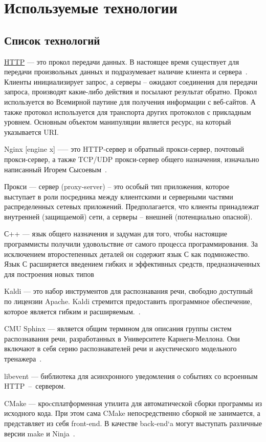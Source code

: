 
\chapter{Используемые технологии}
\section{Список технологий}

\hyperlink{http}{HTTP} --- это прокол передачи данных. В настоящее время существует для передачи
произвольных данных и подразумевает наличие клиента и сервера~\cite{http}.
Клиенты инициализирует запрос, а серверы – ожидают соединения для передачи
запроса, производят какие-либо действия и посылают результат обратно. Прокол
используется во Всемирной паутине для получения информации с веб-сайтов. А
также протокол используется для транспорта других протоколов с прикладным
уровнем. Основным объектом манипуляции является ресурс, на который указывается URI.

Nginx [engine x] —-- это HTTP-сервер и обратный прокси-сервер, почтовый
прокси-сервер, а также TCP/UDP прокси-сервер общего назначения, изначально
написанный Игорем Сысоевым~\cite{nginx}.

Прокси --- сервер (proxy-server) – это особый тип приложения, которое
выступает в роли посредника между клиентскими и серверными частями
распределенных сетевых приложений. Предполагается, что клиенты принадлежат
внутренней (защищаемой) сети, а серверы – внешней (потенциально опасной).

С++ --- язык общего назначения и задуман для того, чтобы настоящие программисты получили
удовольствие от самого процесса программирования. За исключением второстепенных деталей он
содержит язык С как подмножество. Язык С расширяется введением гибких и эффективных средств,
предназначенных для построения новых типов~\cite{cpp}

Kaldi --- это набор инструментов для распознавания речи, свободно доступный по
лицензии Apache. Kaldi стремится предоставить программное обеспечение, которое
является гибким и расширяемым.~\cite{kaldi}.

CMU Sphinx --- является общим термином для описания группы систем распознавания
речи, разработанных в Университете Карнеги-Меллона. Они включают в себя серию
распознавателей речи и акустического модельного тренажера~\cite{sphinx}.

libevent --- библиотека для асинхронного уведомления о событиях со всроенным
HTTP~--~сервером.

CMake — кроcсплатформенная утилита для автоматической сборки программы из
исходного кода. При этом сама CMake непосредственно сборкой не занимается,
а представляет из себя front-end. В качестве back-end`a могут выступать
различные версии make и Ninja~\cite{cmake}.

